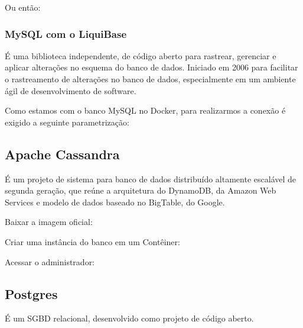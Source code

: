 \documentclass[a4paper,11pt]{article}
\begin{document}
Ou então: \\

\subsubsection{MySQL com o LiquiBase}
É uma biblioteca independente, de código aberto para rastrear, gerenciar e aplicar alterações no esquema do banco de dados. Iniciado em 2006 para facilitar o rastreamento de alterações no banco de dados, especialmente em um ambiente ágil de desenvolvimento de software. 

Como estamos com o banco MySQL no Docker, para realizarmos a conexão é exigido a seguinte parametrização: \\ 

\subsection{Apache Cassandra}
É um projeto de sistema para banco de dados distribuído altamente escalável de segunda geração, que reúne a arquitetura do DynamoDB, da Amazon Web Services e modelo de dados baseado no BigTable, do Google. 

Baixar a imagem oficial: \\

Criar uma instância do banco em um Contêiner: \\

Acessar o administrador: \\

\subsection{Postgres}
É um SGBD relacional, desenvolvido como projeto de código aberto. 
\end{document}
